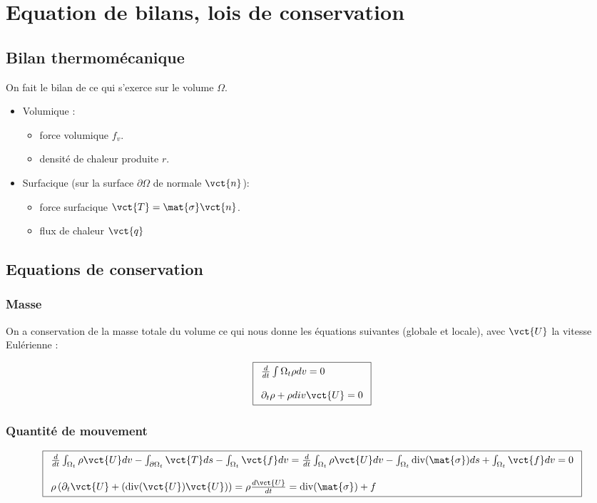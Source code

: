\documentclass[11pt,a4paper]{article}
\begin{document}
\section{Equation de bilans, lois de conservation}

\subsection{Bilan thermomécanique}
On fait le bilan de ce qui s'exerce sur le volume $\Omega$. 
\begin{itemize}
	\item Volumique :
	\begin{itemize}
		\item force volumique $f_v$.
		\item densité de chaleur produite $r$.
	\end{itemize}
	\item Surfacique (sur la surface $\partial\Omega$ de normale $\vct{n}$):
	\begin{itemize}
		\item force surfacique $\vct{T}=\mat{\sigma}\vct{n}$.
		\item flux de chaleur $\vct{q}$
	\end{itemize}
\end{itemize}

\subsection{Equations de conservation}
\subsubsection{Masse}
On a conservation de la masse totale du volume ce qui nous donne les équations suivantes (globale et locale), avec $\vct{U}$ la vitesse Eulérienne :

\begin{equation}
\label{eq:consmasse}
\boxed{
\begin{array}{l}
\frac{d}{dt}\int{\Omega_t}\rho dv=0 \\
\\
\partial_t \rho+\rho div\vct{U}=0
\end{array}
}
\end{equation}

\subsubsection{Quantité de mouvement}
\begin{equation}
\label{eq:consmvt}
\boxed{\begin{array}{l}
\frac{d}{dt}\int_{\Omega_t}\rho\vct{U}dv-\int_{\partial\Omega_t}\vct{T}ds-\int_{\Omega_t}\vct{f}dv=\frac{d}{dt}\int_{\Omega_t}\rho\vct{U}dv-\int_{\Omega_t}\textrm{div}(\mat{\sigma})ds+\int_{\Omega_t}\vct{f}dv=0\\
\\
\rho\left(\partial_t\vct{U}+\left(\textrm{div}(\vct{U})\vct{U}\right)\right)=\rho\frac{d\vct{U}}{dt}=\textrm{div}(\mat{\sigma})+f
\end{array}}
\end{equation}
\end{document}
